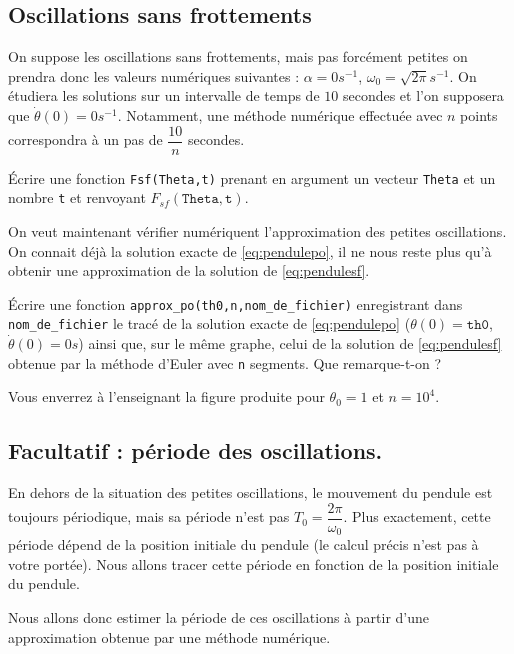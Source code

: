 \subsection{Oscillations sans frottements}

On suppose les oscillations sans frottements, mais pas forcément petites on prendra donc les valeurs numériques suivantes : $\alpha = 0 s^{-1}$, $\omega_0 = \sqrt{2\pi} s^{-1}$.
On étudiera les solutions sur un intervalle de temps de $10$ secondes et l'on supposera que $\dot{\theta}(0) = 0s^{-1}$. 
Notamment, une méthode numérique effectuée avec $n$ points correspondra à un pas de $\dfrac{10}{n}$ secondes. 


\question{} \'Ecrire une fonction \texttt{Fsf(Theta,t)} prenant en argument un vecteur \texttt{Theta} et un nombre \texttt{t} et renvoyant $F_{sf}(\texttt{Theta},\texttt{t})$.

\bigskip{}

On veut maintenant vérifier numériquent l'approximation des petites oscillations. On connait déjà la solution exacte de \eqref{eq:pendulepo}, il ne nous reste plus qu'à obtenir une approximation de la solution de \eqref{eq:pendulesf}. 

\medskip{}

\question{\label{qu:tracesf}} \'Ecrire une fonction \texttt{approx\_po(th0,n,nom\_de\_fichier)} enregistrant dans \texttt{nom\_de\_fichier} le tracé de la solution exacte de \eqref{eq:pendulepo} ($\theta(0) = \texttt{th0}$, $\dot{\theta}(0) = 0s$) ainsi que, sur le même graphe, celui de la solution de \eqref{eq:pendulesf} obtenue par la méthode d'Euler avec \texttt{n} segments.  
Que remarque-t-on ? 

Vous enverrez à l'enseignant la figure produite pour $\theta_0 = 1$ et $n=10^4$. 

\subsection{Facultatif : période des oscillations.}

En dehors de la situation des petites oscillations, le mouvement du pendule est toujours périodique, mais sa période n'est pas $T_0 = \dfrac{2\pi}{\omega_0}$. 
Plus exactement, cette période dépend de la position initiale du pendule (le calcul précis n'est pas à votre portée). Nous allons tracer cette période en fonction de la position initiale du pendule.

Nous allons donc estimer la période de ces oscillations à partir d'une approximation obtenue par une méthode numérique. 

